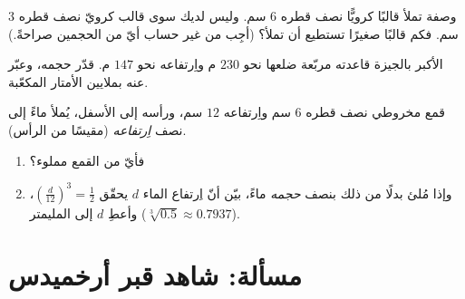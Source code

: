 \begin{exercise}[$\star\star$]\label{exo:g9:solids:7}
وصفة تملأ قالبًا كرويًّا نصف قطره $6$ سم. وليس لديك سوى قالب
كرويّ نصف قطره $3$ سم. فكم قالبًا صغيرًا تستطيع أن تملأ؟
(أجِب من غير حساب أيّ من الحجمين صراحةً.)
\end{exercise}

\begin{exercise}[$\star\star$]\label{exo:g9:solids:8}
 الأكبر بالجيزة قاعدته مربّعة ضلعها نحو $230$ م
واِرتفاعه نحو $147$ م. قدّر حجمه، وعبّر عنه بملايين الأمتار
المكعّبة.
\end{exercise}

\begin{exercise}[$\star\star\star$]\label{exo:g9:solids:9}
قمع مخروطي نصف قطره $6$ سم واِرتفاعه $12$ سم، ورأسه إلى
الأسفل، يُملأ ماءً إلى نصف \emph{اِرتفاعه} (مقيسًا من
الرأس).
\begin{enumerate}
  \item فأيّ  من  القمع مملوء؟
  \item وإذا مُلئ بدلًا من ذلك بنصف \emph{حجمه} ماءً، بيّن أنّ
        اِرتفاع الماء $d$ يحقّق
        $\left(\frac{d}{12}\right)^3 = \frac12$، وأعطِ $d$ إلى
        المليمتر ($\sqrt[3]{0.5} \approx 0.7937$).
\end{enumerate}
\end{exercise}

\section{مسألة: شاهد قبر أرخميدس}

